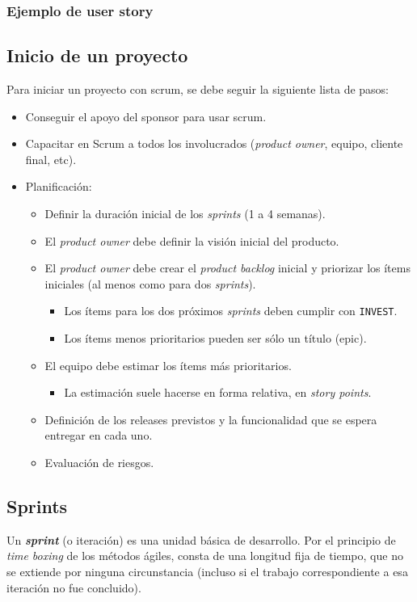 \documentclass[]{article}
\begin{document}
\subsubsection{Ejemplo de user story}

\subsection{Inicio de un proyecto}
Para iniciar un proyecto con scrum, se debe seguir la siguiente lista de pasos:
\begin{itemize}
	\item Conseguir el apoyo del sponsor para usar scrum.
	\item Capacitar en Scrum a todos los involucrados (\emph{product owner}, equipo, cliente final, etc).
	\item Planificación:
	\begin{itemize}
		\item Definir la duración inicial de los \emph{sprints} (1 a 4 semanas).
		\item El \emph{product owner} debe definir la visión inicial del producto.
		\item El \emph{product owner} debe crear el \emph{product backlog} inicial y priorizar los ítems iniciales (al menos como para dos \emph{sprints}).
		\begin{itemize}
			\item Los ítems para los dos próximos \emph{sprints} deben cumplir con \texttt{INVEST}.
			\item Los ítems menos prioritarios pueden ser sólo un título (epic).
		\end{itemize}
		\item El equipo debe estimar los ítems más prioritarios.
		\begin{itemize}
			\item La estimación suele hacerse en forma relativa, en \emph{story points}.
		\end{itemize}
		\item Definición de los releases previstos y la funcionalidad que se espera entregar en cada uno.
		\item Evaluación de riesgos.
	\end{itemize}
\end{itemize}

\subsection{Sprints}
Un \emph{\textbf{sprint}} (o iteración) es una unidad básica de desarrollo. Por el principio de \emph{time boxing} de los métodos ágiles, consta de una longitud fija de tiempo, que no se extiende por ninguna circunstancia (incluso si el trabajo correspondiente a esa iteración no fue concluido).
\end{document}

